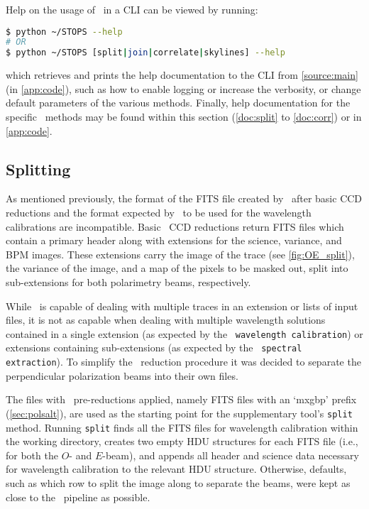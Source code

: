 Help on the usage of \stops\ in a \gls{CLI} can be viewed by running:
\begin{lstlisting}[language=bash]
$ python ~/STOPS --help
# OR
$ python ~/STOPS [split|join|correlate|skylines] --help
\end{lstlisting}
{\parskip=0pt which} retrieves and prints the help documentation to the \gls{CLI} from \autoref{source:main} (in \autoref{app:code}), such as how to enable logging or increase the verbosity, or change default parameters of the various methods. Finally, help documentation for the specific \stops\ methods may be found within this section (\autoref{doc:split} to \ref{doc:corr}) or in \autoref{app:code}.

\subsection{Splitting} \label{subsec:stops_split}



As mentioned previously, the format of the \gls{FITS} file created by \polsalt\ after basic \gls{CCD} reductions and the format expected by \iraf\ to be used for the wavelength calibrations are incompatible. Basic \polsalt\ \gls{CCD} reductions return \gls{FITS} files which contain a primary header along with extensions for the science, variance, and \gls{BPM} images. These extensions carry the image of the trace (see \autoref{fig:OE_split}), the variance of the image, and a map of the pixels to be masked out, split into sub-extensions for both polarimetry beams, respectively.

While \iraf\ is capable of dealing with multiple traces in an extension or lists of input files, it is not as capable when dealing with multiple wavelength solutions contained in a single extension (as expected by the \polsalt\ \texttt{wavelength calibration}) or extensions containing sub-extensions (as expected by the \polsalt\ \texttt{spectral extraction}). To simplify the \iraf\ reduction procedure it was decided to separate the perpendicular polarization beams into their own files.

The files with \polsalt\ pre-reductions applied, namely \gls{FITS} files with an `mxgbp' prefix (\autoref{sec:polsalt}), are used as the starting point for the supplementary tool's \texttt{split} method. Running \texttt{split} finds all the \gls{FITS} files for wavelength calibration within the working directory, creates two empty \gls{HDU} structures for each \gls{FITS} file (i.e., for both the $O$- and $E$-beam), and appends all header and science data necessary for wavelength calibration to the relevant \gls{HDU} structure. Otherwise, defaults, such as which row to split the image along to separate the beams, were kept as close to the \polsalt\ pipeline as possible.

